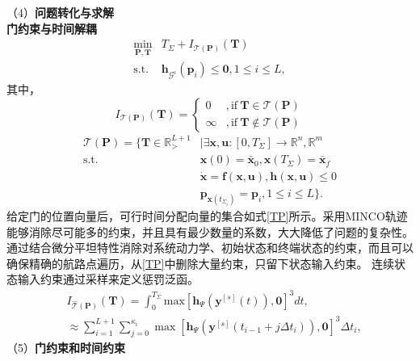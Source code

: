 （4）\textbf{问题转化与求解}\\
\textbf{门约束与时间解耦}
\begin{equation}
    \begin{aligned}\min_{\mathbf{P},\mathbf{T}}&T_{\Sigma}+I_{\mathcal{T}(\mathbf{P})}(\mathbf{T})\\\mathrm{s.t.}&\mathbf{h}_{\mathcal{G}^{i}}(\mathbf{p}_{i})\leq\mathbf{0}, 1\leq i\leq L,\end{aligned}
\end{equation}
其中，
\begin{equation}
    I_{\mathcal{T}(\mathbf{P})}(\mathbf{T})=\left\{\begin{array}{ll}0&,\mathrm{if~}\mathbf{T}\in\mathcal{T}(\mathbf{P})\\
        \infty&,\mathrm{if~}\mathbf{T}\notin\mathcal{T}(\mathbf{P})\end{array}\right.
\end{equation}
\begin{equation}
    \begin{aligned}\label{TP}
\mathcal{T}(\mathbf{P})=\{\mathbf{T}\in\mathbb{R}_{>}^{L+1}& \mid\exists\mathbf{x},\mathbf{u}:[0,T_\Sigma]\to\mathbb{R}^n,\mathbb{R}^m \\
\text{s.t.}& \mathbf{x}(0)=\bar{\mathbf{x}}_{0}, \mathbf{x}(T_{\Sigma})=\bar{\mathbf{x}}_{f} \\
&\dot{\mathbf{x}}=\mathbf{f}(\mathbf{x},\mathbf{u}),\mathbf{h}(\mathbf{x},\mathbf{u})\leq0 \\
&\mathbf{p}_{\mathbf{x}(t_{\Sigma_{i}})}=\mathbf{p}_{i}, 1\leq i\leq L\}.
\end{aligned}
\end{equation}
给定门的位置向量后，可行时间分配向量的集合如式\ref{TP}所示。采用MINCO轨迹能够消除尽可能多的约束，并且具有最少数量的系数，大大降低了问题的复杂性。
通过结合微分平坦特性消除对系统动力学、初始状态和终端状态的约束，而且可以确保精确的航路点遍历，从\ref{TP}中删除大量约束，只留下状态输入约束。
连续状态输入约束通过采样来定义惩罚泛函。
\begin{equation}
    \begin{aligned}
&I_{\hat{\mathcal{T}}(\mathbf{P})}(\mathbf{T})=\int_{0}^{T_{\Sigma}}\mathrm{max}[\mathbf{h}_{\Psi}(\mathbf{y}^{[s]}(t)),\mathbf{0}]^{3}dt, \\
&\approx\sum_{i=1}^{L+1}\sum_{j=0}^{\kappa_i}\max[\mathbf{h}_\Psi(\mathbf{y}^{[s]}(t_{i-1}+j\Delta t_i)),\mathbf{0}]^3\Delta t_i,
\end{aligned}
\end{equation}
（5）\textbf{门约束和时间约束}


